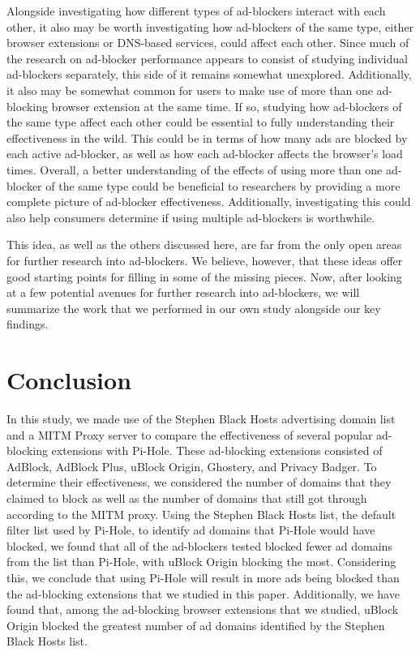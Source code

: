 \documentclass[sigsmall]{acmart}
\begin{document}
 Alongside investigating how different types of ad-blockers interact with each other, it also may be worth investigating how ad-blockers of the same type, either browser extensions or DNS-based services, could affect each other. Since much of the research on ad-blocker performance appears to consist of studying individual ad-blockers separately, this side of it remains somewhat unexplored. Additionally, it also may be somewhat common for users to make use of more than one ad-blocking browser extension at the same time. If so, studying how ad-blockers of the same type affect each other could be essential to fully understanding their effectiveness in the wild. This could be in terms of how many ads are blocked by each active ad-blocker, as well as how each ad-blocker affects the browser’s load times. Overall, a better understanding of the effects of using more than one ad-blocker of the same type could be beneficial to researchers by providing a more complete picture of ad-blocker effectiveness. Additionally, investigating this could also help consumers determine if using multiple ad-blockers is worthwhile.
	
 This idea, as well as the others discussed here, are far from the only open areas for further research into ad-blockers. We believe, however, that these ideas offer good starting points for filling in some of the missing pieces. Now, after looking at a few potential avenues for further research into ad-blockers, we will summarize the work that we performed in our own study alongside our key findings.



\section*{Conclusion}
In this study, we made use of the Stephen Black Hosts advertising domain list and a MITM Proxy server to compare the effectiveness of several popular ad-blocking extensions with Pi-Hole. These ad-blocking extensions consisted of AdBlock, AdBlock Plus, uBlock Origin, Ghostery, and Privacy Badger. To determine their effectiveness, we considered the number of domains that they claimed to block as well as the number of domains that still got through according to the MITM proxy. Using the Stephen Black Hosts list, the default filter list used by Pi-Hole, to identify ad domains that Pi-Hole would have blocked, we found that all of the ad-blockers tested blocked fewer ad domains from the list than Pi-Hole, with uBlock Origin blocking the most. Considering this, we conclude that using Pi-Hole will result in more ads being blocked than the ad-blocking extensions that we studied in this paper. Additionally, we have found that, among the ad-blocking browser extensions that we studied, uBlock Origin blocked the greatest number of ad domains identified by the Stephen Black Hosts list. 



\end{document}
